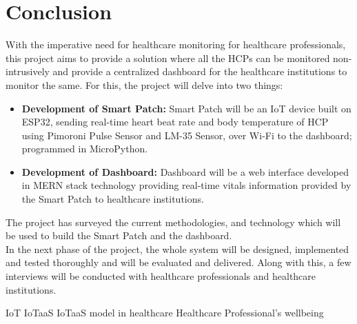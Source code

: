 \newpage

\chapter{Conclusion}

With the imperative need for healthcare monitoring for healthcare professionals, this project aims to provide a solution where all the HCPs can be monitored non-intrusively and provide a centralized dashboard for the healthcare institutions to monitor the same. For this, the project will delve into two things:
\begin{itemize}
    \item \textbf{Development of Smart Patch:} Smart Patch will be an IoT device built on ESP32, sending real-time heart beat rate and body temperature of HCP using Pimoroni Pulse Sensor and LM-35 Sensor, over Wi-Fi to the dashboard; programmed in MicroPython. 
    \item \textbf{Development of Dashboard:} Dashboard will be a web interface developed in MERN stack technology providing real-time vitals information provided by the Smart Patch to healthcare institutions. 
\end{itemize}

 The project has surveyed the current methodologies, and technology which will be used to build the Smart Patch and the dashboard. \\

\noindent In the next phase of the project, the whole system will be designed, implemented and tested thoroughly and will be evaluated and delivered. Along with this, a few interviews will be conducted with healthcare professionals and healthcare institutions.


IoT
IoTaaS
IoTaaS model in healthcare
Healthcare Professional's wellbeing
